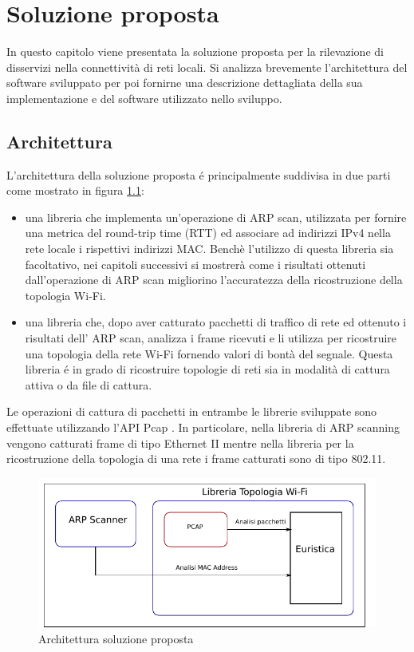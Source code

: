 \chapter{Soluzione proposta}
In questo capitolo viene presentata la soluzione proposta per la rilevazione di disservizi nella connettivit\`a di reti locali.
Si analizza brevemente l'architettura del software sviluppato per poi fornirne una descrizione dettagliata della sua implementazione e del software utilizzato nello sviluppo.

\section{Architettura}
L'architettura della soluzione proposta \'e principalmente suddivisa in due parti come mostrato in figura \ref{fig:solproposta}: %
\begin{itemize}

\item una libreria che implementa un'operazione di ARP \cite{rfc826} scan, utilizzata per fornire una metrica del round-trip time (RTT) ed associare ad indirizzi IPv4 nella rete locale i rispettivi indirizzi MAC.
Bench\`e l'utilizzo di questa libreria sia facoltativo, nei capitoli successivi si mostrer\`a come i risultati ottenuti dall'operazione di ARP scan migliorino l'accuratezza della ricostruzione della topologia Wi-Fi.
\item una libreria che, dopo aver catturato pacchetti di traffico di rete ed ottenuto i risultati dell' ARP scan, analizza i frame ricevuti e li utilizza per ricostruire una topologia della rete Wi-Fi fornendo valori di bont\`a del segnale.
Questa libreria \'e in grado di ricostruire topologie di reti sia in modalit\`a di cattura attiva o da file di cattura.
\end{itemize}

Le operazioni di cattura di pacchetti in entrambe le librerie sviluppate sono effettuate utilizzando l'API Pcap \cite{pcap}.
In particolare, nella libreria di ARP scanning vengono catturati frame di tipo Ethernet II mentre nella libreria per la ricostruzione della topologia di una rete i frame catturati sono di tipo 802.11.

\begin{figure}[!htb]
	\centering
	\includegraphics{images/img4.pdf}
	\caption{Architettura soluzione proposta}
	\label{fig:solproposta}
\end{figure}


